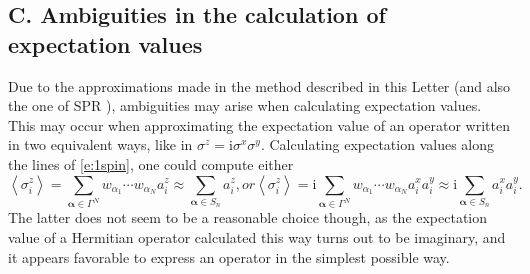 \documentclass[aps,prl,showpacs,amsmath,amssymb,superscriptaddress,reprint,10pt]{revtex4-1}
\newcommand\ii{{\mathrm{i}}}
\newcommand{\mvec}[1]{\boldsymbol #1}
\begin{document}
\begin{bibunit}
\section{C. Ambiguities in the calculation of expectation values}
\setcounter{section}{3}
\setcounter{equation}{0}
\setcounter{figure}{0}

Due to the approximations made in the method described in this Letter (and also the one of SPR \cite{Schachenmayer_etal15}), ambiguities may arise when calculating expectation values. This may occur when approximating the expectation value of an operator written in two equivalent ways, like in $\sigma^z=\ii\sigma^x\sigma^y$. Calculating expectation values along the lines of \eqref{e:1spin}, one could compute either
\begin{subequations}
\begin{equation}
\left\langle\sigma_i^z\right\rangle =\sum_{\mvec{\alpha}\in\Gamma^N}w_{\alpha_1}\cdots w_{\alpha_N} a_i^z \approx \sum_{\mvec{\alpha}\in S_n}a_i^z,
\end{equation}
or
\begin{equation}
\left\langle\sigma_i^z\right\rangle =\ii\sum_{\mvec{\alpha}\in\Gamma^N}w_{\alpha_1}\cdots w_{\alpha_N} a_i^x a_i^y \approx \ii\sum_{\mvec{\alpha}\in S_n}a_i^x a_i^y.
\end{equation}
\end{subequations}
The latter does not seem to be a reasonable choice though, as the expectation value of a Hermitian operator calculated this way turns out to be imaginary, and it appears favorable to express an operator in the simplest possible way.


\end{bibunit}
\end{document}
